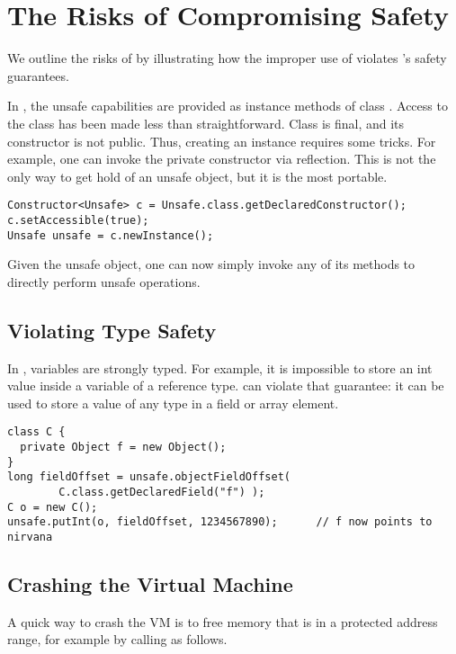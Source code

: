 \section{The Risks of Compromising Safety}
\label{sec:unsafe:background}

We outline the risks of \unsafe{} by illustrating how the improper use of
\unsafe{} violates \java{}'s safety guarantees.

In \java{}, the unsafe capabilities are provided as instance methods of
class \smu{}.
Access to the class has been made less than straightforward.
Class \smu{} is final, and its constructor is not public.
Thus, creating an instance requires some tricks.
For example, one can invoke the private constructor via reflection.
This is not the only way to get hold of an unsafe object,
but it is the most portable.

\begin{lstlisting}[style=java,caption=Instantiating an Unsafe object]
Constructor<Unsafe> c = Unsafe.class.getDeclaredConstructor();
c.setAccessible(true);
Unsafe unsafe = c.newInstance();
\end{lstlisting}
 
Given the unsafe object, one can now simply invoke any of its methods to
directly perform unsafe operations.

\subsection{Violating Type Safety}

In \java{}, variables are strongly typed.
For example, it is impossible to store an int value inside a variable of
a reference type.
\unsafe{} can violate that guarantee:
it can be used to store a value of any type in a field or array element.

\begin{lstlisting}[style=java,caption=\smu{} can violate type safety]
class C {
  private Object f = new Object();
}
long fieldOffset = unsafe.objectFieldOffset(
        C.class.getDeclaredField("f") );
C o = new C();
unsafe.putInt(o, fieldOffset, 1234567890);      // f now points to nirvana
\end{lstlisting}

\subsection{Crashing the Virtual Machine}

A quick way to crash the VM is to free memory that is in a protected
address range, for example by calling  as follows.

